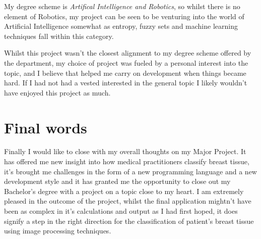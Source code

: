 My degree scheme is \textit{Artifical Intelligence and Robotics}, so whilst there is no element of Robotics, my project can be seen to be venturing into the world of Artificial Intelligence somewhat as entropy, fuzzy sets and machine learning techniques fall within this category.

Whilst this project wasn't the closest alignment to my degree scheme offered by the department, my choice of project was fueled by a personal interest into the topic, and I believe that helped me carry on development when things became hard. If I had not had a vested interested in the general topic I likely wouldn't have enjoyed this project as much.

\section{Final words}

Finally I would like to close with my overall thoughts on my Major Project. It has offered me new insight into how medical practitioners classify breast tissue, it's brought me challenges in the form of a new programming language and a new development style and it has granted me the opportunity to close out my Bachelor's degree with a project on a topic close to my heart. I am extremely pleased in the outcome of the project, whilst the final application mightn't have been as complex in it's calculations and output as I had first hoped, it does signify a step in the right direction for the classification of patient's breast tissue using image processing techniques.
